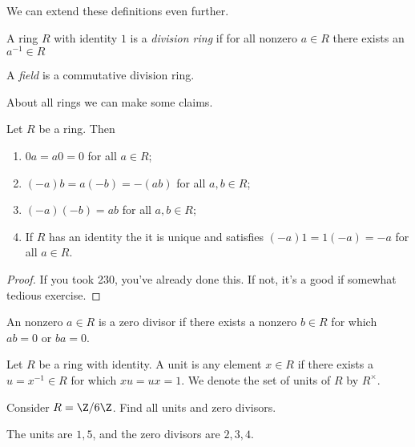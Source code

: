 We can extend these definitions even further.

\begin{definition}
A ring $R$ with identity $1$ is a \emph{division ring} if for all nonzero $a \in R$ there exists an $a^{-1} \in R$
\end{definition}

\begin{definition}[Field]
A \emph{field} is a commutative division ring.
\end{definition}

About all rings we can make some claims.

\begin{proposition}
Let $R$ be a ring. Then
\begin{enumerate}
\item $0a = a0 = 0$ for all $a \in R$;
\item $(-a)b = a(-b) = -(ab)$ for all $a,b \in R$;
\item $(-a)(-b) = ab$ for all $a,b \in R$;
\item If $R$ has an identity the it is unique and satisfies $(-a)1 = 1(-a) = -a$ for all $a \in R$.
\end{enumerate}
\end{proposition}

\begin{proof}
If you took 230, you've already done this. If not, it's a good if somewhat tedious exercise.
\end{proof}

\begin{definition}
An nonzero $a \in R$ is a zero divisor if there exists a nonzero $b \in R$ for which $ab = 0$ or $ba = 0$.
\end{definition}

\begin{definition}[Unit]
Let $R$ be a ring with identity. A unit is any element $x \in R$ if there exists a $u = x^{-1} \in R$ for which $xu = ux = 1$. We denote the set of units of $R$ by $R^\times$.
\end{definition}

\begin{example}
Consider $R = \Z/6\Z$. Find all units and zero divisors.
\end{example}

\begin{solution}
The units are $1,5$, and the zero divisors are $2,3,4$.
\end{solution}

